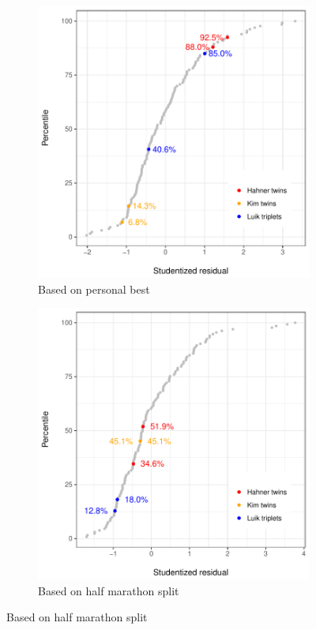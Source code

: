 \documentclass[12pt,titlepage]{article}
\begin{document}
\begin{figure}[!ht]
  \centering
  \caption{Studentized residuals from Olympic finishing time regressions}
  \label{fig:residuals}
  \begin{subfigure}{.495\textwidth}
    \centering
    \includegraphics[width=\textwidth, keepaspectratio]{studentized_residuals.pdf}
    \caption{Based on personal best} 
    \label{fig:studentizedresiduals}
  \end{subfigure}
  \begin{subfigure}{.495\textwidth}
    \centering
    \includegraphics[width=\textwidth, keepaspectratio]{studentized_residuals_half.pdf}
    \caption{Based on half marathon split}
    \label{fig:studentizedresiduals_half}
  \end{subfigure}
\end{figure}
\end{document}

